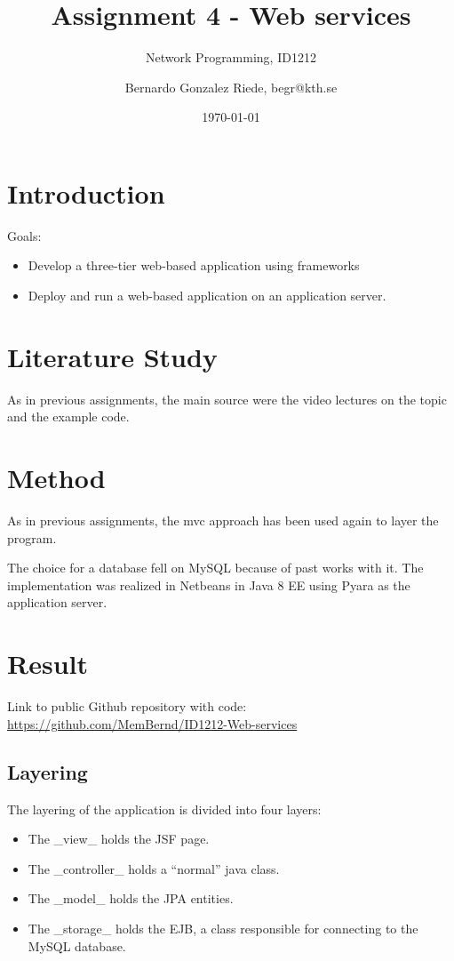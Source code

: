 \documentclass[a4paper]{scrartcl}
\title{Assignment 4 - Web services}
\subtitle{Network Programming, ID1212}
\author{Bernardo Gonzalez Riede, begr@kth.se}
\date{\today}
\begin{document}
\maketitle

\section{Introduction}
Goals:
\begin{itemize}
	\item Develop a three-tier web-based application using frameworks
	\item Deploy and run a web-based application on an application server.
\end{itemize}


\section{Literature Study}
As in previous assignments, the main source were the video lectures on the topic and the example code.

\section{Method}
As in previous assignments, the mvc approach has been used again to layer the program.

The choice for a database fell on MySQL because of past works with it.
The implementation was realized in Netbeans in Java 8 EE using Pyara as the application server.


\section{Result}

Link to public Github repository with code:
\href{https://github.com/MemBernd/ID1212-Web-services}{https://github.com/MemBernd/ID1212-Web-services}

\subsection{Layering}
The layering of the application is divided into four layers:
\begin{itemize}
	\item The _view_ holds the JSF page.
	\item The _controller_ holds a ``normal'' java class.
	\item The _model_ holds the JPA entities.
	\item The _storage_ holds the EJB, a class responsible for connecting to the MySQL database.
\end{itemize}
\end{document}
